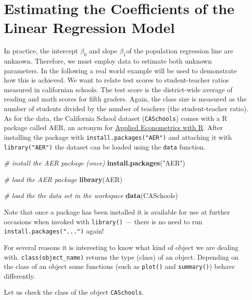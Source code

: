\documentclass[]{book}
\newenvironment{Shaded}{\begin{snugshade}}{\end{snugshade}}
\newcommand{\KeywordTok}[1]{\textcolor[rgb]{0.13,0.29,0.53}{\textbf{#1}}}
\newcommand{\StringTok}[1]{\textcolor[rgb]{0.31,0.60,0.02}{#1}}
\newcommand{\CommentTok}[1]{\textcolor[rgb]{0.56,0.35,0.01}{\textit{#1}}}
\newcommand{\NormalTok}[1]{#1}
\theoremstyle{definition}
\theoremstyle{definition}
\theoremstyle{definition}
\theoremstyle{remark}
\begin{document}
\section{Estimating the Coefficients of the Linear Regression
Model}\label{estimating-the-coefficients-of-the-linear-regression-model}

In practice, the intercept \(\beta_0\) and slope \(\beta_1\)of the
population regression line are unknown. Therefore, we must employ data
to estimate both unknown parameters. In the following a real world
example will be used to demonstrate how this is achieved. We want to
relate test scores to student-teacher ratios measured in californian
schools. The test score is the district-wide average of reading and math
scores for fifth graders. Again, the class size is measured as the
number of students divided by the number of teachers (the
student-teacher ratio). As for the data, the California School dataset
(\texttt{CASchools}) comes with a R package called AER, an acronym for
\href{https://cran.r-project.org/web/packages/AER/AER.pdf}{Applied
Econometrics with R}. After installing the package with
\texttt{install.packages("AER")} and attaching it with
\texttt{library("AER")} the dataset can be loaded using the
\texttt{data} function.

\begin{Shaded}
\begin{Highlighting}[]
\CommentTok{# install the AER package (once)}
\KeywordTok{install.packages}\NormalTok{(}\StringTok{"AER"}\NormalTok{)}

\CommentTok{# load the AER package }
\KeywordTok{library}\NormalTok{(AER)   }

\CommentTok{# load the the data set in the workspace}
\KeywordTok{data}\NormalTok{(CASchools) }
\end{Highlighting}
\end{Shaded}

Note that once a package has been installed it is available for use at
further occasions when invoked with \texttt{library()} --- there is no
need to run \texttt{install.packages("...")} again!

For several reasons it is interesting to know what kind of object we are
dealing with. \texttt{class(object\_name)} returns the type (class) of
an object. Depending on the class of an object some functions (such as
\texttt{plot()} and \texttt{summary()}) behave differently.

Let us check the class of the object \texttt{CASchools}.
\end{document}
